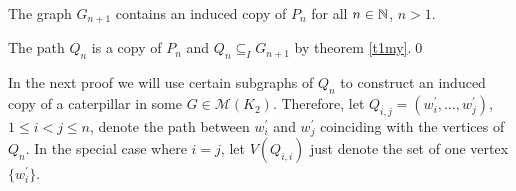 \begin{cor}\label{c1my}
The graph $G_{n+1}$ contains an induced copy of $P_n$ for all $n\in\mathbb{N}$, $n>1$.
\end{cor}
\begin{prf}
The path $Q_n$ is a copy of $P_n$ and $Q_n\subseteq_I G_{n+1}$ by theorem \ref{t1my}.\qed
\end{prf}

In the next proof we will use certain subgraphs of $Q_n$ to construct an induced copy of a caterpillar in some $G\in\mathcal{M}(K_2)$. Therefore, let $Q_{i,j}=(w_i^\prime ,\dots , w_j^\prime )$, $1\leq i < j\leq n$, denote the path between $w_i^\prime$ and $w_j^\prime$ coinciding with the vertices of $Q_n$. In the special case where $i=j$, let $V(Q_{i,i})$ just denote the set of one vertex $\lbrace w_i^\prime \rbrace$.

